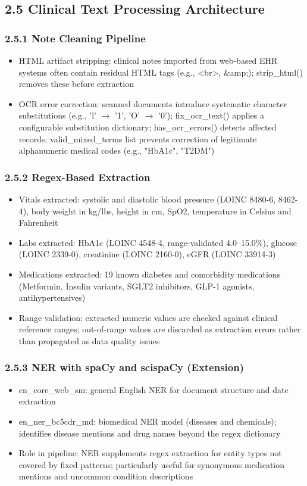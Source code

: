 \documentclass[11pt,a4paper]{article}
\begin{document}
\subsection{2.5 Clinical Text Processing Architecture}

\subsubsection{2.5.1 Note Cleaning Pipeline}
\begin{itemize}
\item HTML artifact stripping: clinical notes imported from web-based EHR systems often contain residual HTML tags (e.g., <br>, \&amp;); strip\_html() removes these before extraction
\item OCR error correction: scanned documents introduce systematic character substitutions (e.g., 'l' $\rightarrow$ '1', 'O' $\rightarrow$ '0'); fix\_ocr\_text() applies a configurable substitution dictionary; has\_ocr\_errors() detects affected records; valid\_mixed\_terms list prevents correction of legitimate alphanumeric medical codes (e.g., "HbA1c", "T2DM")
\end{itemize}

\subsubsection{2.5.2 Regex-Based Extraction}
\begin{itemize}
\item Vitals extracted: systolic and diastolic blood pressure (LOINC 8480-6, 8462-4), body weight in kg/lbs, height in cm, SpO2, temperature in Celsius and Fahrenheit
\item Labs extracted: HbA1c (LOINC 4548-4, range-validated 4.0--15.0\%), glucose (LOINC 2339-0), creatinine (LOINC 2160-0), eGFR (LOINC 33914-3)
\item Medications extracted: 19 known diabetes and comorbidity medications (Metformin, Insulin variants, SGLT2 inhibitors, GLP-1 agonists, antihypertensives)
\item Range validation: extracted numeric values are checked against clinical reference ranges; out-of-range values are discarded as extraction errors rather than propagated as data quality issues
\end{itemize}

\subsubsection{2.5.3 NER with spaCy and scispaCy (Extension)}
\begin{itemize}
\item en\_core\_web\_sm: general English NER for document structure and date extraction
\item en\_ner\_bc5cdr\_md: biomedical NER model (diseases and chemicals); identifies disease mentions and drug names beyond the regex dictionary
\item Role in pipeline: NER supplements regex extraction for entity types not covered by fixed patterns; particularly useful for synonymous medication mentions and uncommon condition descriptions
\end{itemize}
\end{document}
